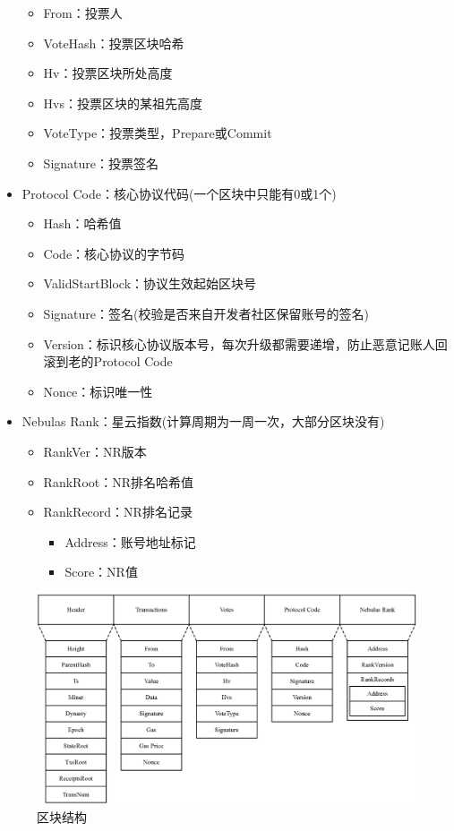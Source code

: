 \begin{itemize}
\begin{itemize}
		\item From：投票人
		\item VoteHash：投票区块哈希
		\item Hv：投票区块所处高度
		\item Hvs：投票区块的某祖先高度
		\item VoteType：投票类型，Prepare或Commit
		\item Signature：投票签名
		\end{itemize}
	\item Protocol Code：核心协议代码(一个区块中只能有0或1个)
		\begin{itemize}
		\item Hash：哈希值
		\item Code：核心协议的字节码
		\item ValidStartBlock：协议生效起始区块号
		\item Signature：签名(校验是否来自开发者社区保留账号的签名)
		\item Version：标识核心协议版本号，每次升级都需要递增，防止恶意记账人回滚到老的Protocol Code
		\item Nonce：标识唯一性
		\end{itemize}
	\item Nebulas Rank：星云指数(计算周期为一周一次，大部分区块没有)
		\begin{itemize}
		\item RankVer：NR版本
		\item RankRoot：NR排名哈希值
		\item RankRecord：NR排名记录
			\begin{itemize}
				\item Address：账号地址标记
				\item Score：NR值
			\end{itemize}
		\end{itemize}
\end{itemize}

\begin{figure}[h]
\centering
\includegraphics[width=13cm]{./figs/block}
\caption{区块结构}
\label{fig:block}
\end{figure}


